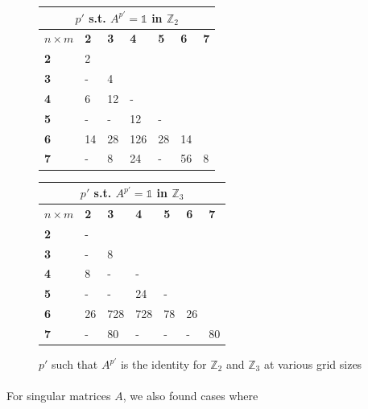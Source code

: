 \documentclass[11pt]{article}
\newcommand{\na}{-}
\newcommand{\fl}{\cellcolor{light-gray}}
\newcommand{\modZ}[1]{$\mathbb{Z}_{#1}$}
\begin{document}
\begin{figure}[H]
  \caption{$p'$ such that $A^{p'}$ is the identity for \modZ{2} and \modZ{3} at various grid sizes}
  \label{cycles-table}
  \begin{center}
  \begin{tabular}{|l|l|l|l|l|l|l|}
    \hline
    \multicolumn{7}{|c|}{$p'$ s.t. $A^{p'}=\mathbb{1}$ in $\mathbb{Z}_2$} \\ \hline
    $n\times m$&\textbf{2}&\textbf{3}&\textbf{4}&\textbf{5}&\textbf{6}&\textbf{7}\\ \hline
    \textbf{2} & 2   & \fl & \fl & \fl & \fl & \fl \\ \hline
    \textbf{3} & \na & 4   & \fl & \fl & \fl & \fl \\ \hline
    \textbf{4} & 6   & 12  & \na & \fl & \fl & \fl \\ \hline
    \textbf{5} & \na & \na & 12  & \na & \fl & \fl \\ \hline
    \textbf{6} & 14  & 28  & 126 & 28  & 14  & \fl \\ \hline
    \textbf{7} & \na & 8   & 24  & \na & 56  & 8   \\ \hline
  \end{tabular} \begin{tabular}{|l|l|l|l|l|l|l|}
    \hline
    \multicolumn{7}{|c|}{$p'$ s.t. $A^{p'}=\mathbb{1}$ in $\mathbb{Z}_3$} \\ \hline
    $n\times m$&\textbf{2}&\textbf{3}&\textbf{4}&\textbf{5}&\textbf{6}&\textbf{7}\\ \hline
    \textbf{2} & \na & \fl & \fl & \fl & \fl & \fl \\ \hline
    \textbf{3} & \na & 8   & \fl & \fl & \fl & \fl \\ \hline
    \textbf{4} & 8   & \na & \na & \fl & \fl & \fl \\ \hline
    \textbf{5} & \na & \na & 24  & \na & \fl & \fl \\ \hline
    \textbf{6} & 26  & 728 & 728 & 78  & 26  & \fl \\ \hline
    \textbf{7} & \na & 80  & \na & \na & \na & 80  \\ \hline
  \end{tabular}
  \end{center}
\end{figure}

\paragraph{} For singular matrices $A$, we also found cases where
\end{document}
